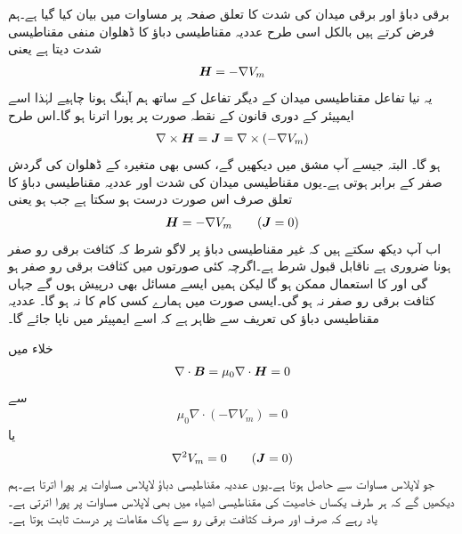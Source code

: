 برقی دباؤ اور برقی میدان کی شدت کا تعلق صفحہ  پر مساوات  میں بیان کیا گیا ہے۔ہم فرض کرتے ہیں  بالکل اسی طرح عددیہ مقناطیسی دباؤ  کا ڈھلوان منفی مقناطیسی شدت دیتا ہے یعنی
\begin{align*}
{\ensuremath{{\boldsymbol{H}}}}=-\nabla V_m
\end{align*}
یہ نیا تفاعل مقناطیسی میدان کے دیگر تفاعل کے ساتھ ہم آہنگ ہونا چاہیے لہٰذا اسے ایمپیئر کے دوری قانون کے نقطہ صورت پر پورا اترنا ہو گا۔اس طرح
\begin{align}
\nabla \times {\ensuremath{{\boldsymbol{H}}}}={{\boldsymbol{J}}}=\nabla \times \left(-\nabla V_m\right) 
\end{align}
ہو گا۔ البتہ جیسے آپ مشق  میں دیکھیں گے، کسی بھی متغیرہ کے  ڈھلوان کی گردش صفر کے برابر ہوتی  ہے۔یوں مقناطیسی میدان کی شدت اور عددیہ مقناطیسی دباؤ کا تعلق صرف اس صورت درست ہو سکتا ہے جب  ہو یعنی
\begin{align}\label{مساوات_مقناطیسی_شدت_غیر_سمتی_دباو}
{\ensuremath{{\boldsymbol{H}}}}=-\nabla V_m \quad \quad ({{\boldsymbol{J}}}=0)
\end{align}
اب آپ دیکھ سکتے ہیں کہ غیر مقناطیسی دباؤ پر لاگو شرط کہ کثافت برقی رو صفر ہونا ضروری ہے ناقابل قبول شرط ہے۔اگرچہ کئی صورتوں میں کثافت برقی رو صفر ہو گی اور  کا استعمال ممکن ہو گا لیکن ہمیں ایسے مسائل بھی درپیش ہوں  گے جہاں کثافت برقی رو صفر نہ ہو گی۔ایسی صورت میں  ہمارے کسی کام کا نہ ہو گا۔ عددیہ مقناطیسی دباؤ  کی تعریف سے ظاہر ہے کہ اسے ایمپیئر میں ناپا جائے گا۔

خلاء میں
\begin{align*}
\nabla \cdot {\ensuremath{{\boldsymbol{B}}}}=\mu_0 \nabla \cdot {\ensuremath{{\boldsymbol{H}}}}=0
\end{align*}
سے
\begin{align*}
\mu_0 \nabla \cdot \left(-\nabla V_m \right)=0
\end{align*}
یا
\begin{align}
\nabla^2 V_m=0 \quad \quad ({{\boldsymbol{J}}}=0)
\end{align}
جو لاپلاس مساوات سے حاصل ہوتا ہے۔یوں عددیہ مقناطیسی دباؤ لاپلاس مساوات پر پورا اترتا ہے۔ہم دیکھیں گے کہ ہر طرف یکساں خاصیت کی مقناطیسی اشیاء میں بھی  لاپلاس مساوات پر پورا اترتی ہے۔یاد رہے کہ  صرف اور صرف کثافت برقی رو سے پاک مقامات پر درست ثابت ہوتا ہے۔

